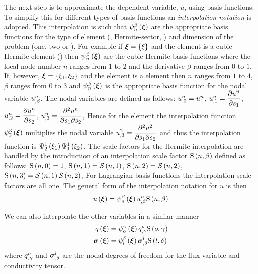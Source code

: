 The next step is to approximate the dependent variable, $u$, using basis
functions. To simplify this for different types of basis functions an
\emph{interpolation notation} is adopted. This interpolation is such that
$   \psi_{n}^{\beta} \left(  \boldsymbol{\xi}  \right)  $ are the appropriate basis functions for the
type of element (\eg \bicubicherm, Hermite-sector, \etc) and dimension of 
the problem (one, two or \threedal). For example if $ \boldsymbol{\xi} =\left\{ \xi \right\}$ 
and the element is a cubic Hermite element
() then $   \psi_{n}^{\beta} \left(  \boldsymbol{\xi}  \right)  $ 
are the cubic Hermite basis functions where the local node number $n$ ranges 
from $1$ to $2$ and the derivative $\beta$ ranges from $0$ to $1$. If,
however, $ \boldsymbol{\xi} =\left\{ \xi_{1},\xi_{2} \right\}$ and the element is a \bicubicherm 
element then $n$ ranges from $1$ to $4$, $\beta$ ranges from $0$ to $3$ and
$   \psi_{n}^{\beta} \left(  \boldsymbol{\xi}  \right)  $ is the appropriate basis function for the nodal
variable $  {u}^{n} _{,\beta} $. The nodal variables are defined as
follows: $  {u}^{n} _{,0} = {u}^{n} $,
$  {u}^{n} _{,1} = \dfrac{\partial  {u}^{n} }{\partial s_{1}} $,
$  {u}^{n} _{,2} = \dfrac{\partial  {u}^{n} }{\partial s_{2}} $,
$  {u}^{n} _{,3} = \dfrac{\partial^{2}  {u}^{n} }{\partial s_{1} \partial s_{2}} $,
\etc Hence for the \bicubicherm element the interpolation function
$   \psi_{2}^{3} \left(  \boldsymbol{\xi}  \right)  $ multiplies the nodal variable
$  {u}^{2} _{,3} = \dfrac{\partial^{2} u^{2}}{\partial s_{1} \partial s_{2}} $ and thus the
interpolation function is $   \Psi_{2}^{1} \left( \xi_{1} \right)     \Psi_{1}^{1} \left( \xi_{2} \right)  $.  The
scale factors for the Hermite interpolation are handled by the introduction of
an interpolation scale factor $   \mathrm{S} \left( n,\beta \right)  $ defined as follows:
$   \mathrm{S} \left( n,0 \right)  =1$, $   \mathrm{S} \left( n,1 \right)  =   \mathcal{S} \left( n,1 \right)  $, $   \mathrm{S} \left( n,2 \right)  =
   \mathcal{S} \left( n,2 \right)  $, $   \mathrm{S} \left( n,3 \right)  =   \mathcal{S} \left( n,1 \right)     \mathcal{S} \left( n,2 \right)  $,
\etc For Lagrangian basis functions the interpolation scale factors are all
one. The general form of the interpolation notation for $u$ is then
\begin{equation}
  \fnof{u}{\vectr{\xi}}=\gbfn{n}{\beta}{\vectr{\xi}}\nodedof{u}{n}{\beta}\gsf{n}{\beta}
  \label{eqn:uInterpolationLaplace}
\end{equation}

We can also interpolate the other variables in a similar manner \ie
\begin{equation}
  \begin{split}
     q\left(  \boldsymbol{\xi}  \right)  &=    \psi_{o}^{\gamma} \left(  \boldsymbol{\xi}  \right)    {q}^{o} _{,\gamma}    \mathrm{S} \left( o,\gamma \right)   \\
     \boldsymbol{\mathit{\sigma}}\left(  \boldsymbol{\xi}  \right) 
    &=   \psi_{l}^{\delta} \left(  \boldsymbol{\xi}  \right)    {\boldsymbol{\mathit{\sigma}}}^{l} _{,\delta}    \mathrm{S} \left( l,\delta \right)   \\
  \end{split}
\end{equation}
where $  {q}^{o} _{,\gamma} $ and $  {\boldsymbol{\mathit{\sigma}}}^{l} _{,\delta} $ are the
nodal degrees-of-freedom for the flux variable and conductivity tensor.

